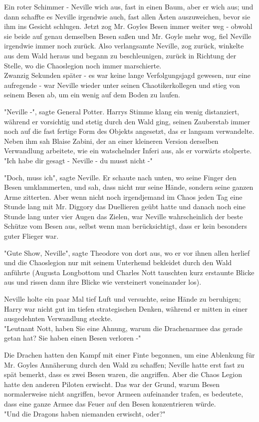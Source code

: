 {Ein roter Schimmer - Neville wich aus, fast in einen Baum, aber er wich aus; und dann schaffte es Neville irgendwie auch, fast allen Ästen auszuweichen, bevor sie ihm ins Gesicht schlugen. Jetzt zog Mr. Goyles Besen immer weiter weg - obwohl sie beide auf genau demselben Besen saßen und Mr. Goyle mehr wog, fiel Neville irgendwie immer noch zurück. Also verlangsamte Neville, zog zurück, winkelte aus dem Wald heraus und begann zu beschleunigen, zurück in Richtung der Stelle, wo die Chaoslegion noch immer marschierte.\\ Zwanzig Sekunden später - es war keine lange Verfolgungsjagd gewesen, nur eine aufregende - war Neville wieder unter seinen Chaotikerkollegen und stieg von seinem Besen ab, um ein wenig auf dem Boden zu laufen.

"Neville -", sagte General Potter. Harrys Stimme klang ein wenig distanziert, während er vorsichtig und stetig durch den Wald ging, seinen Zauberstab immer noch auf die fast fertige Form des Objekts angesetzt, das er langsam verwandelte. Neben ihm sah Blaise Zabini, der an einer kleineren Version derselben Verwandlung arbeitete, wie ein watschelnder Inferi aus, als er vorwärts stolperte.\\ "Ich habe dir gesagt - Neville - du musst nicht -"

"Doch, muss ich", sagte Neville. Er schaute nach unten, wo seine Finger den Besen umklammerten, und sah, dass nicht nur seine Hände, sondern seine ganzen Arme zitterten. Aber wenn nicht noch irgendjemand im Chaos jeden Tag eine Stunde lang mit Mr. Diggory das Duellieren geübt hatte und danach noch eine Stunde lang unter vier Augen das Zielen, war Neville wahrscheinlich der beste Schütze vom Besen aus, selbst wenn man berücksichtigt, dass er kein besonders guter Flieger war.

"Gute Show, Neville", sagte Theodore von dort aus, wo er vor ihnen allen herlief und die Chaoslegion nur mit seinem Unterhemd bekleidet durch den Wald anführte (Augusta Longbottom und Charles Nott tauschten kurz erstaunte Blicke aus und rissen dann ihre Blicke wie versteinert voneinander los).

Neville holte ein paar Mal tief Luft und versuchte, seine Hände zu beruhigen; Harry war nicht gut im tiefen strategischen Denken, während er mitten in einer ausgedehnten Verwandlung steckte.\\ "Leutnant Nott, haben Sie eine Ahnung, warum die Drachenarmee das gerade getan hat? Sie haben einen Besen verloren -"

Die Drachen hatten den Kampf mit einer Finte begonnen, um eine Ablenkung für Mr. Goyles Annäherung durch den Wald zu schaffen; Neville hatte erst fast zu spät bemerkt, dass es zwei Besen waren, die angriffen. Aber die Chaos Legion hatte den anderen Piloten erwischt. Das war der Grund, warum Besen normalerweise nicht angriffen, bevor Armeen aufeinander trafen, es bedeutete, dass eine ganze Armee das Feuer auf den Besen konzentrieren würde.\\ "Und die Dragons haben niemanden erwischt, oder?"

}
